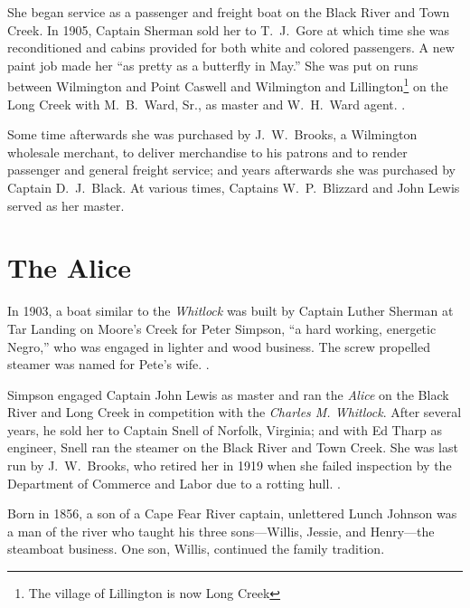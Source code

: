 \documentclass[11pt, a5paper, openright]{book}
\newcommand{\steamer}[1]{\textit{#1}\index{#1,~steamer}}
\begin{document}
She began service as a passenger and freight boat on the Black River
and Town Creek.  In 1905, Captain Sherman
sold her to T.~J.\ Gore at which time she was
reconditioned and cabins provided for both white and colored
passengers.  A new paint job made her ``as pretty as a butterfly in
May.''  She was put on runs between Wilmington and Point Caswell and
Wilmington and Lillington\footnote{The village of Lillington is now Long Creek}
on the Long Creek with M.~B.\ Ward, Sr., as
master and W.~H.\ Ward agent.  \citep[10-6-2905]{ws}.\par

Some time afterwards she was purchased by J.~W.\ Brooks, a Wilmington
wholesale merchant, to deliver merchandise to his patrons and to
render passenger and general freight service; and years afterwards she
was purchased by Captain D.~J.\ Black.
At various times, Captains W.~P.\ Blizzard
and John Lewis served as her master.\par

\section{The Alice}

In 1903, a boat similar to the \textit{Whitlock} was built by Captain
Luther Sherman at Tar Landing on
Moore's Creek for Peter Simpson, ``a hard
working, energetic Negro,'' who was engaged in lighter and wood %
business.  The screw propelled steamer was named for Pete's wife.
\citep[11-6-1903]{ws} \citep{wardmb}.\par

Simpson engaged Captain John Lewis as
master and ran the \steamer{Alice} on the Black River and Long Creek
in competition with the \steamer{Charles M. Whitlock}.  After several
years, he sold her to Captain Snell of Norfolk,
Virginia; and with Ed Tharp as engineer, Snell ran
the steamer on the Black River and Town Creek.  She was last run by
J.~W.\ Brooks, who retired her in 1919 when she failed inspection by
the Department of Commerce and Labor due to a rotting hull.
\citep{johnsonjf}\citep{cavalieril}\citep{wardmb}.\par

Born in 1856, a son of a Cape Fear River captain, unlettered Lunch
Johnson was a man of the river who taught his
three sons---Willis, Jessie, and Henry---the steamboat business.  One
son, Willis, continued the family
tradition.\par
\end{document}
